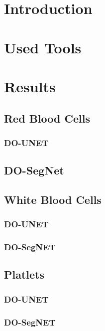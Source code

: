 \section{Introduction}
\vspace{0.2in}
\hspace*{0.16in}

\section{Used Tools}
\vspace{0.2in}
\hspace*{0.16in}


\section{Results}

\subsection{Red Blood Cells}
\subsubsection{DO-UNET}

\subsection{DO-SegNet}

\subsection{White Blood Cells}
\subsubsection{DO-UNET}
\subsubsection{DO-SegNET}


\subsection{Platlets}
\subsubsection{DO-UNET}
\subsubsection{DO-SegNET}


\subsection{}
\vspace{0.2in}
\hspace*{0.16in}